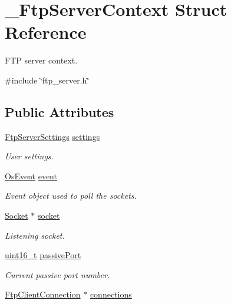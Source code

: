 \hypertarget{struct__FtpServerContext}{}\section{\+\_\+\+Ftp\+Server\+Context Struct Reference}
\label{struct__FtpServerContext}


F\+TP server context.  




{\ttfamily \#include \char`\"{}ftp\+\_\+server.\+h\char`\"{}}

\subsection*{Public Attributes}
\begin{DoxyCompactItemize}
\item 
\hyperlink{structFtpServerSettings}{Ftp\+Server\+Settings} \hyperlink{struct__FtpServerContext_a5c9364e9bdda94c7a36e8df7488153ae}{settings}
\begin{DoxyCompactList}\small\item\em User settings. \end{DoxyCompactList}\item 
\hyperlink{structOsEvent}{Os\+Event} \hyperlink{struct__FtpServerContext_a940308f73a285177761851d18321200c}{event}
\begin{DoxyCompactList}\small\item\em Event object used to poll the sockets. \end{DoxyCompactList}\item 
\hyperlink{socket_8h_aa85acfb0fa336ef495e6ba87fb88fc48}{Socket} $\ast$ \hyperlink{struct__FtpServerContext_a3fdee8fbe65cba5662f79f2ef2c45d82}{socket}
\begin{DoxyCompactList}\small\item\em Listening socket. \end{DoxyCompactList}\item 
\hyperlink{stdint_8h_a273cf69d639a59973b6019625df33e30}{uint16\+\_\+t} \hyperlink{struct__FtpServerContext_ac7a1f9ed8441187cd857c673472fa00c}{passive\+Port}
\begin{DoxyCompactList}\small\item\em Current passive port number. \end{DoxyCompactList}\item 
\hyperlink{ftp__server_8h_ab682699c15473841571a42c3df57e9d2}{Ftp\+Client\+Connection} $\ast$ \hyperlink{struct__FtpServerContext_a66c28b1e81c44178f7c4067d61a8b22c}{connections}

\end{DoxyCompactItemize}
